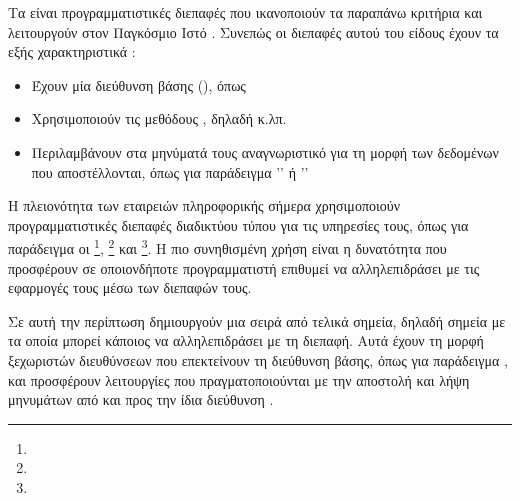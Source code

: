 Τα  είναι προγραμματιστικές διεπαφές που ικανοποιούν τα παραπάνω κριτήρια και λειτουργούν στον Παγκόσμιο Ιστό \cite{jin2018designing}.
Συνεπώς οι διεπαφές αυτού του είδους έχουν τα εξής χαρακτηριστικά \cite{amundsen2013restful}:

\begin{itemize}
    \item Έχουν μία διεύθυνση βάσης (), όπως \emph{}
    \item Χρησιμοποιούν τις μεθόδους , δηλαδή  κ.λπ.
    \item Περιλαμβάνουν στα μηνύματά τους αναγνωριστικό για τη μορφή των δεδομένων που αποστέλλονται, όπως για παράδειγμα '' ή ''
\end{itemize}

Η πλειονότητα των εταιρειών πληροφορικής σήμερα χρησιμοποιούν προγραμματιστικές διεπαφές διαδικτύου τύπου  για τις υπηρεσίες τους,
όπως για παράδειγμα οι
\footnote{},
\footnote{} και
\footnote{}.
Η πιο συνηθισμένη χρήση είναι η δυνατότητα που προσφέρουν σε οποιονδήποτε προγραμματιστή επιθυμεί να αλληλεπιδράσει με τις εφαρμογές τους
μέσω των διεπαφών τους.

Σε αυτή την περίπτωση δημιουργούν μια σειρά από τελικά σημεία,
δηλαδή σημεία με τα οποία μπορεί κάποιος να αλληλεπιδράσει με τη διεπαφή.
Αυτά έχουν τη μορφή ξεχωριστών διευθύνσεων που επεκτείνουν τη διεύθυνση βάσης,
όπως για παράδειγμα \emph{},
και προσφέρουν λειτουργίες που πραγματοποιούνται με την αποστολή και λήψη  μηνυμάτων από και προς την ίδια διεύθυνση \cite{masse_rest_2012}.